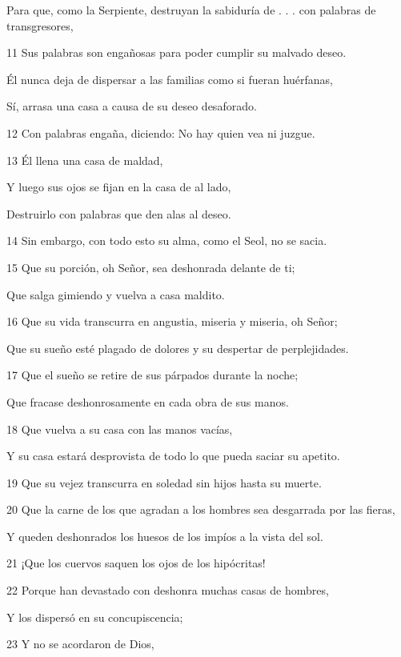 \par     Para que, como la Serpiente, destruyan la sabiduría de . . . con palabras de transgresores,
\par 11 Sus palabras son engañosas para poder cumplir su malvado deseo.
\par     Él nunca deja de dispersar a las familias como si fueran huérfanas,
\par     Sí, arrasa una casa a causa de su deseo desaforado.
\par 12 Con palabras engaña, diciendo: No hay quien vea ni juzgue.
\par 13 Él llena una casa de maldad,
\par     Y luego sus ojos se fijan en la casa de al lado,
\par     Destruirlo con palabras que den alas al deseo.
\par 14 Sin embargo, con todo esto su alma, como el Seol, no se sacia.
\par   
\par 15 Que su porción, oh Señor, sea deshonrada delante de ti;
\par     Que salga gimiendo y vuelva a casa maldito.
\par 16 Que su vida transcurra en angustia, miseria y miseria, oh Señor;
\par     Que su sueño esté plagado de dolores y su despertar de perplejidades.
\par 17 Que el sueño se retire de sus párpados durante la noche;
\par     Que fracase deshonrosamente en cada obra de sus manos.
\par 18 Que vuelva a su casa con las manos vacías,
\par     Y su casa estará desprovista de todo lo que pueda saciar su apetito.
\par 19 Que su vejez transcurra en soledad sin hijos hasta su muerte.
\par   
\par 20 Que la carne de los que agradan a los hombres sea desgarrada por las fieras,
\par     Y queden deshonrados los huesos de los impíos a la vista del sol.
\par 21 ¡Que los cuervos saquen los ojos de los hipócritas!
\par 22 Porque han devastado con deshonra muchas casas de hombres,
\par     Y los dispersó en su concupiscencia;
\par 23 Y no se acordaron de Dios,
